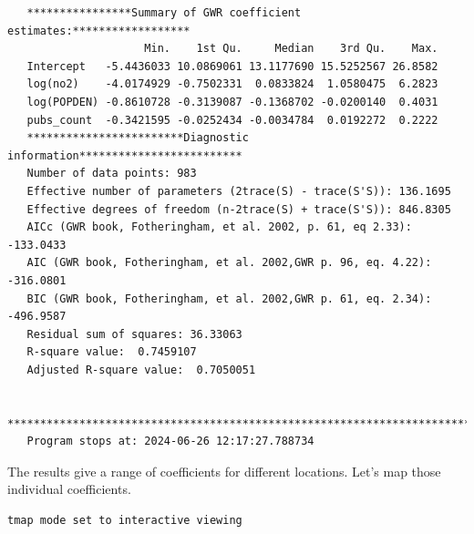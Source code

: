 \documentclass[
  letterpaper,
  DIV=11,
  numbers=noendperiod]{scrreprt}
\newenvironment{Shaded}{\begin{snugshade}}{\end{snugshade}}
\newcommand{\CommentTok}[1]{\textcolor[rgb]{0.37,0.37,0.37}{#1}}
\newcommand{\FunctionTok}[1]{\textcolor[rgb]{0.28,0.35,0.67}{#1}}
\newcommand{\NormalTok}[1]{\textcolor[rgb]{0.00,0.23,0.31}{#1}}
\newcommand{\OtherTok}[1]{\textcolor[rgb]{0.00,0.23,0.31}{#1}}
\newcommand{\SpecialCharTok}[1]{\textcolor[rgb]{0.37,0.37,0.37}{#1}}
\newcommand{\StringTok}[1]{\textcolor[rgb]{0.13,0.47,0.30}{#1}}
\begin{document}
\begin{verbatim}
   ****************Summary of GWR coefficient estimates:******************
                     Min.    1st Qu.     Median    3rd Qu.    Max.
   Intercept   -5.4436033 10.0869061 13.1177690 15.5252567 26.8582
   log(no2)    -4.0174929 -0.7502331  0.0833824  1.0580475  6.2823
   log(POPDEN) -0.8610728 -0.3139087 -0.1368702 -0.0200140  0.4031
   pubs_count  -0.3421595 -0.0252434 -0.0034784  0.0192272  0.2222
   ************************Diagnostic information*************************
   Number of data points: 983 
   Effective number of parameters (2trace(S) - trace(S'S)): 136.1695 
   Effective degrees of freedom (n-2trace(S) + trace(S'S)): 846.8305 
   AICc (GWR book, Fotheringham, et al. 2002, p. 61, eq 2.33): -133.0433 
   AIC (GWR book, Fotheringham, et al. 2002,GWR p. 96, eq. 4.22): -316.0801 
   BIC (GWR book, Fotheringham, et al. 2002,GWR p. 61, eq. 2.34): -496.9587 
   Residual sum of squares: 36.33063 
   R-square value:  0.7459107 
   Adjusted R-square value:  0.7050051 

   ***********************************************************************
   Program stops at: 2024-06-26 12:17:27.788734 
\end{verbatim}

The results give a range of coefficients for different locations. Let's
map those individual coefficients.

\begin{Shaded}
\end{Shaded}

\begin{verbatim}
tmap mode set to interactive viewing
\end{verbatim}
\end{document}
